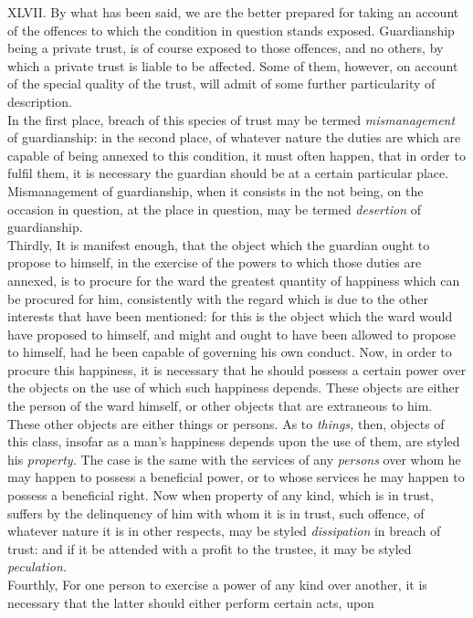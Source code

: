 \documentclass[12pt]{report}
\begin{document}
XLVII. By what has been said, we are the better prepared for taking an
account of the offences to which the condition in question stands
exposed. Guardianship being a private trust, is of course exposed to
those offences, and no others, by which a private trust is liable to be
affected. Some of them, however, on account of the special quality of
the trust, will admit of some further particularity of description.\\
In the first place, breach of this species of trust may be termed
\emph{mismanagement} of guardianship: in the second place, of whatever
nature the duties are which are capable of being annexed to this
condition, it must often happen, that in order to fulfil them, it is
necessary the guardian should be at a certain particular place.
Mismanagement of guardianship, when it consists in the not being, on the
occasion in question, at the place in question, may be termed
\emph{desertion} of guardianship.\\
Thirdly, It is manifest enough, that the object which the guardian ought
to propose to himself, in the exercise of the powers to which those
duties are annexed, is to procure for the ward the greatest quantity of
happiness which can be procured for him, consistently with the regard
which is due to the other interests that have been mentioned: for this
is the object which the ward would have proposed to himself, and might
and ought to have been allowed to propose to himself, had he been
capable of governing his own conduct. Now, in order to procure this
happiness, it is necessary that he should possess a certain power over
the objects on the use of which such happiness depends. These objects
are either the person of the ward himself, or other objects that are
extraneous to him. These other objects are either things or persons. As
to \emph{things,} then, objects of this class, insofar as a man's
happiness depends upon the use of them, are styled his \emph{property.}
The case is the same with the services of any \emph{persons} over whom
he may happen to possess a beneficial power, or to whose services he may
happen to possess a beneficial right. Now when property of any kind,
which is in trust, suffers by the delinquency of him with whom it is in
trust, such offence, of whatever nature it is in other respects, may be
styled \emph{dissipation} in breach of trust: and if it be attended with
a profit to the trustee, it may be styled \emph{peculation.}\\
Fourthly, For one person to exercise a power of any kind over another,
it is necessary that the latter should either perform certain acts, upon
\end{document}
